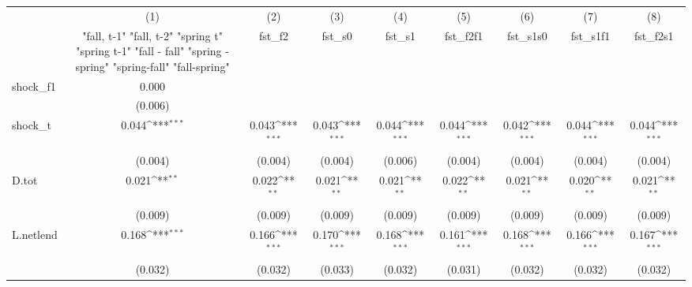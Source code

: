 {
\def\sym#1{\ifmmode^{#1}\else\(^{#1}\)\fi}
\begin{tabular}{l*{8}{c}}
\toprule
            &\multicolumn{1}{c}{(1)}&\multicolumn{1}{c}{(2)}&\multicolumn{1}{c}{(3)}&\multicolumn{1}{c}{(4)}&\multicolumn{1}{c}{(5)}&\multicolumn{1}{c}{(6)}&\multicolumn{1}{c}{(7)}&\multicolumn{1}{c}{(8)}\\
            &\multicolumn{1}{c}{  "fall, t-1" "fall, t-2" "spring t" "spring t-1"  "fall - fall" "spring - spring" "spring-fall" "fall-spring" }&\multicolumn{1}{c}{fst\_f2}&\multicolumn{1}{c}{fst\_s0}&\multicolumn{1}{c}{fst\_s1}&\multicolumn{1}{c}{fst\_f2f1}&\multicolumn{1}{c}{fst\_s1s0}&\multicolumn{1}{c}{fst\_s1f1}&\multicolumn{1}{c}{fst\_f2s1}\\
\midrule
shock\_f1    &       0.000         &                     &                     &                     &                     &                     &                     &                     \\
            &     (0.006)         &                     &                     &                     &                     &                     &                     &                     \\
\addlinespace
shock\_t     &       0.044\sym{***}&       0.043\sym{***}&       0.043\sym{***}&       0.044\sym{***}&       0.044\sym{***}&       0.042\sym{***}&       0.044\sym{***}&       0.044\sym{***}\\
            &     (0.004)         &     (0.004)         &     (0.004)         &     (0.006)         &     (0.004)         &     (0.004)         &     (0.004)         &     (0.004)         \\
\addlinespace
D.tot       &       0.021\sym{**} &       0.022\sym{**} &       0.021\sym{**} &       0.021\sym{**} &       0.022\sym{**} &       0.021\sym{**} &       0.020\sym{**} &       0.021\sym{**} \\
            &     (0.009)         &     (0.009)         &     (0.009)         &     (0.009)         &     (0.009)         &     (0.009)         &     (0.009)         &     (0.009)         \\
\addlinespace
L.netlend   &       0.168\sym{***}&       0.166\sym{***}&       0.170\sym{***}&       0.168\sym{***}&       0.161\sym{***}&       0.168\sym{***}&       0.166\sym{***}&       0.167\sym{***}\\
            &     (0.032)         &     (0.032)         &     (0.033)         &     (0.032)         &     (0.031)         &     (0.032)         &     (0.032)         &     (0.032)         \\

\end{tabular}}
